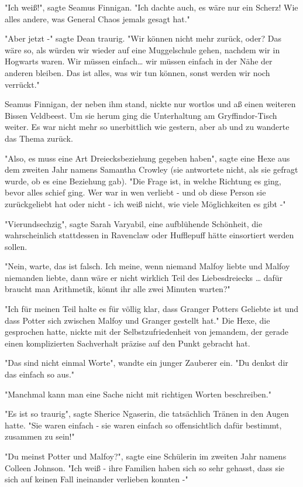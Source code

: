 {"Ich weiß!", sagte Seamus Finnigan. "Ich dachte auch, es wäre nur ein Scherz! Wie alles andere, was General Chaos jemals gesagt hat."

"Aber jetzt -" sagte Dean traurig. "Wir können nicht mehr zurück, oder? Das wäre so, als würden wir wieder auf eine Muggelschule gehen, nachdem wir in Hogwarts waren. Wir müssen einfach… wir müssen einfach in der Nähe der anderen bleiben. Das ist alles, was wir tun können, sonst werden wir noch verrückt."

Seamus Finnigan, der neben ihm stand, nickte nur wortlos und aß einen weiteren Bissen Veldbeest. Um sie herum ging die Unterhaltung am Gryffindor-Tisch weiter. Es war nicht mehr so unerbittlich wie gestern, aber ab und zu wanderte das Thema zurück.

"Also, es muss eine Art Dreiecksbeziehung gegeben haben", sagte eine Hexe aus dem zweiten Jahr namens Samantha Crowley (sie antwortete nicht, als sie gefragt wurde, ob es eine Beziehung gab). "Die Frage ist, in welche Richtung es ging, bevor alles schief ging. Wer war in wen verliebt - und ob diese Person sie zurückgeliebt hat oder nicht - ich weiß nicht, wie viele Möglichkeiten es gibt -"

"Vierundsechzig", sagte Sarah Varyabil, eine aufblühende Schönheit, die wahrscheinlich stattdessen in Ravenclaw oder Hufflepuff hätte einsortiert werden sollen.

"Nein, warte, das ist falsch. Ich meine, wenn niemand Malfoy liebte und Malfoy niemanden liebte, dann wäre er nicht wirklich Teil des Liebesdreiecks … dafür braucht man Arithmetik, könnt ihr alle zwei Minuten warten?"

"Ich für meinen Teil halte es für völlig klar, dass Granger Potters Geliebte ist und dass Potter sich zwischen Malfoy und Granger gestellt hat." Die Hexe, die gesprochen hatte, nickte mit der Selbstzufriedenheit von jemandem, der gerade einen komplizierten Sachverhalt präzise auf den Punkt gebracht hat.

"Das sind nicht einmal Worte", wandte ein junger Zauberer ein. "Du denkst dir das einfach so aus."

"Manchmal kann man eine Sache nicht mit richtigen Worten beschreiben."

"Es ist so traurig", sagte Sherice Ngaserin, die tatsächlich Tränen in den Augen hatte. "Sie waren einfach - sie waren einfach so offensichtlich dafür bestimmt, zusammen zu sein!"

"Du meinst Potter und Malfoy?", sagte eine Schülerin im zweiten Jahr namens Colleen Johnson. "Ich weiß - ihre Familien haben sich so sehr gehasst, dass sie sich auf keinen Fall ineinander verlieben konnten -"

}
